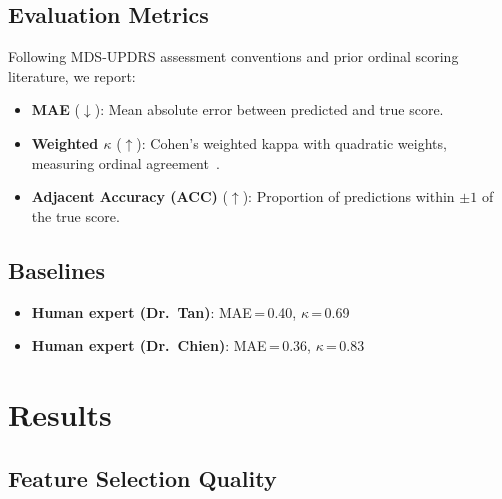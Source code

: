 \documentclass[conference]{IEEEtran}
\begin{document}
\subsection{Evaluation Metrics}
Following MDS-UPDRS assessment conventions and prior ordinal scoring literature, we
report:
\begin{itemize}
    \item \textbf{MAE} ($\downarrow$): Mean absolute error between predicted and true score.
    \item \textbf{Weighted $\kappa$} ($\uparrow$): Cohen's weighted kappa with quadratic
          weights, measuring ordinal agreement~\cite{vanbelle2016}.
    \item \textbf{Adjacent Accuracy (ACC)} ($\uparrow$): Proportion of predictions
          within $\pm 1$ of the true score.
\end{itemize}

\subsection{Baselines}
\begin{itemize}
    \item \textbf{Human expert (Dr.\ Tan)}: MAE\,=\,0.40, $\kappa$\,=\,0.69
      
    \item \textbf{Human expert (Dr.\ Chien)}: MAE\,=\,0.36, $\kappa$\,=\,0.83
 
\end{itemize}

\section{Results}

\subsection{Feature Selection Quality}
\end{document}
